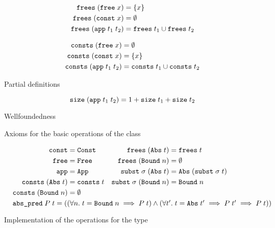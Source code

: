 \begin{code}[t]
  \begin{subcode}{\linewidth}
    \begin{minipage}{.48\linewidth}
      \begin{align*}
        \texttt{\textup{frees}}\;(\texttt{\textup{free}}\;x) &= \{ x \} \\
        \texttt{\textup{frees}}\;(\texttt{\textup{const}}\;x) &= \emptyset \\
        \texttt{\textup{frees}}\;(\texttt{\textup{app}}\;t_1\;t_2) &= \texttt{\textup{frees}}\;t_1 \cup \texttt{\textup{frees}}\;t_2
      \end{align*}
    \end{minipage}\hfill
    \begin{minipage}{.48\linewidth}
      \begin{align*}
        \texttt{\textup{consts}}\;(\texttt{\textup{free}}\;x) &= \emptyset \\
        \texttt{\textup{consts}}\;(\texttt{\textup{const}}\;x) &= \{ x \} \\
        \texttt{\textup{consts}}\;(\texttt{\textup{app}}\;t_1\;t_2) &= \texttt{\textup{consts}}\;t_1 \cup \texttt{\textup{consts}}\;t_2
      \end{align*}
    \end{minipage}

    \caption{Partial definitions}
  \end{subcode}

  \begin{subcode}{\linewidth}
    \[ \texttt{\textup{size}}\;(\texttt{\textup{app}}\;t_1\;t_2) = 1 + \texttt{\textup{size}}\;t_1 + \texttt{\textup{size}}\;t_2 \]
    \caption{Wellfoundedness}
    \label{code:terms:algebra:basic:size}
  \end{subcode}
  \caption{Axioms for the basic operations of the  class}
  \label{code:terms:algebra:basic}
\end{code}

\begin{code}
  \begin{align*}
    \holconst{const} &= \holconst{Const} & \holconst{frees}\;(\holconst{Abs}\;t) &= \holconst{frees}\;t\\
    \holconst{free} &= \holconst{Free} & \holconst{frees}\;(\holconst{Bound}\;n) &= \emptyset\\
    \holconst{app} &= \holconst{App} & \holconst{subst}\;\sigma\;(\holconst{Abs}\;t) &= \holconst{Abs}\;(\holconst{subst}\;\sigma\;t) \qquad\phantom{foo} \\
    \holconst{consts}\;(\holconst{Abs}\;t) &= \holconst{consts}\;t & \holconst{subst}\;\sigma\;(\holconst{Bound}\;n) &= \holconst{Bound}\;n\\
    \holconst{consts}\;(\holconst{Bound}\;n) &= \emptyset \\
    \omit\rlap{$\holconst{abs\_pred}\;P\;t = (
      (\forall n.\;t = \holconst{Bound}\;n \implies P\;t) \wedge
      (\forall t'.\;t = \holconst{Abs}\;t' \implies P\;t' \implies P\;t)
    )$}
  \end{align*}
  \caption{Implementation of the  operations for the  type}
  \label{code:terms:algebra:inst}
\end{code}

